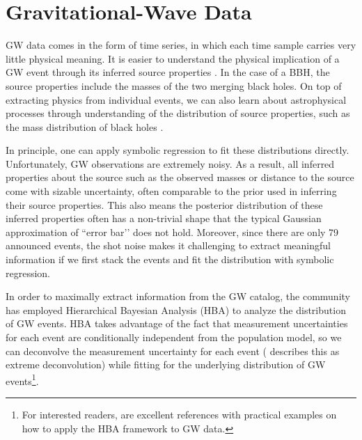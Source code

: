 \documentclass[nohyperref]{article}
\theoremstyle{plain}
\theoremstyle{definition}
\theoremstyle{remark}
\begin{document}
\section{Gravitational-Wave Data}
\label{sec:GWdata}

GW data comes in the form of time series, in which each time sample carries very little physical meaning.
It is easier to understand the physical implication of a GW event through its inferred source properties \cite{Veitch:2014wba}.
In the case of a BBH, the source properties include the masses of the two merging black holes.
On top of extracting physics from individual events,
we can also learn about astrophysical processes through understanding of the distribution of source properties, such as the mass distribution of black holes \cite{2019PASA...36...10T,Vitale:2020aaz}.

In principle, one can apply symbolic regression to fit these distributions directly.
Unfortunately, GW observations are extremely noisy. As a result, all inferred properties about the source such as the observed masses or distance to the source come with sizable uncertainty, often comparable to the prior used in inferring their source properties.
This also means the posterior distribution of these inferred properties often has a non-trivial shape that the typical Gaussian approximation of ``error bar’’ does not hold.
Moreover, since there are only 79 announced events, the shot noise makes it challenging to extract meaningful information if we first stack the events and fit the distribution with symbolic regression.

In order to maximally extract information from the GW catalog, the community has employed Hierarchical Bayesian Analysis (HBA) to analyze the distribution of GW events.
HBA takes advantage of the fact that measurement uncertainties for each event are conditionally independent from the population model, so we can deconvolve the measurement uncertainty for each event (\citealt{10.1214/10-AOAS439} describes this as extreme deconvolution) while fitting for the underlying distribution of GW events\footnote{For interested readers, \cite{Mandel:2018mve,Vitale:2020aaz,2019MNRAS.484.4008G} are excellent references with practical examples on how to apply the HBA framework to GW data.
}.

\newcommand\ppd{posterior predictive distribution\xspace} %
\newcommand{\defineppd}{} %
\end{document}
